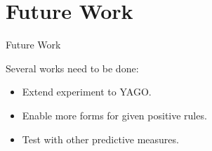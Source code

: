 \documentclass{beamer}
\begin{document}
\section{Future Work}

\begin{frame}{Future Work}

Several works need to be done:

\begin{itemize}
	\item Extend experiment to YAGO.
	\item Enable more forms for given positive rules.
	\item Test with other predictive measures.
\end{itemize}

\end{frame}

%
%
%
%    
%    
%
% 
%    
%
\end{document}
